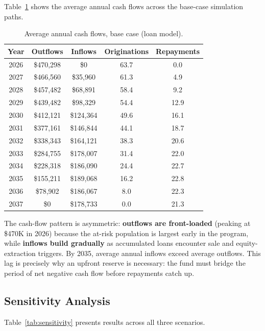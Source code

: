 \documentclass[11pt, letterpaper]{article}
\begin{document}
Table~\ref{tab:cashflows} shows the average annual cash flows across the base-case simulation paths.

\begin{table}[H]
  \centering
  \caption{Average annual cash flows, base case (loan model).}
  \label{tab:cashflows}
  \begin{tabular}{@{}ccccc@{}}
    \toprule
    \textbf{Year} & \textbf{Outflows} & \textbf{Inflows} & \textbf{Originations} & \textbf{Repayments} \\
    \midrule
    2026 & \$470{,}298 & \$0       & 63.7 & 0.0  \\
    2027 & \$466{,}560 & \$35{,}960  & 61.3 & 4.9  \\
    2028 & \$457{,}482 & \$68{,}891  & 58.4 & 9.2  \\
    2029 & \$439{,}482 & \$98{,}329  & 54.4 & 12.9 \\
    2030 & \$412{,}121 & \$124{,}364 & 49.6 & 16.1 \\
    2031 & \$377{,}161 & \$146{,}844 & 44.1 & 18.7 \\
    2032 & \$338{,}343 & \$164{,}121 & 38.3 & 20.6 \\
    2033 & \$284{,}755 & \$178{,}007 & 31.4 & 22.0 \\
    2034 & \$228{,}318 & \$186{,}090 & 24.4 & 22.7 \\
    2035 & \$155{,}211 & \$189{,}068 & 16.2 & 22.8 \\
    2036 & \$78{,}902  & \$186{,}067 & 8.0  & 22.3 \\
    2037 & \$0         & \$178{,}733 & 0.0  & 21.3 \\
    \bottomrule
  \end{tabular}
\end{table}

The cash-flow pattern is asymmetric: \textbf{outflows are front-loaded} (peaking at \$470K in 2026) because the at-risk population is largest early in the program, while \textbf{inflows build gradually} as accumulated loans encounter sale and equity-extraction triggers. By 2035, average annual inflows exceed average outflows. This lag is precisely why an upfront reserve is necessary: the fund must bridge the period of net negative cash flow before repayments catch up.

\subsection{Sensitivity Analysis}

Table~\ref{tab:sensitivity} presents results across all three scenarios.
\end{document}
